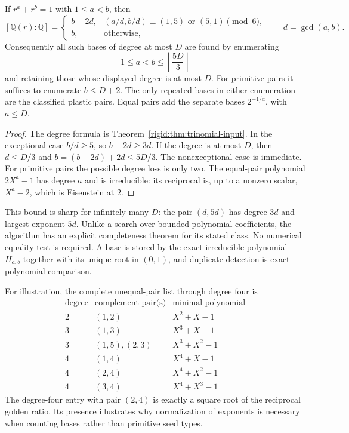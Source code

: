 \begin{corollary}
\label{rigid:cor:degree-search}
If $r^a+r^b=1$ with $1\le a<b$, then
\[
[\mathbb Q(r):\mathbb Q]=
\begin{cases}
b-2d,&(a/d,b/d)\equiv(1,5)\text{ or }(5,1)\pmod6,\\
b,&\text{otherwise},
\end{cases}
\qquad d=\gcd(a,b).
\]
Consequently all such bases of degree at most $D$ are found by
enumerating
\[
1\le a<b\le\left\lfloor\frac{5D}{3}\right\rfloor
\]
and retaining those whose displayed degree is at most $D$.
For primitive pairs it suffices to enumerate $b\le D+2$.
The only repeated bases in either enumeration are the classified
plastic pairs.  Equal pairs add the separate bases $2^{-1/a}$,
with $a\le D$.
\end{corollary}

\begin{proof}
The degree formula is Theorem~\ref{rigid:thm:trinomial-input}.  In the
exceptional case $b/d\ge5$, so $b-2d\ge3d$.  If the degree is
at most $D$, then $d\le D/3$ and
$b=(b-2d)+2d\le5D/3$.  The nonexceptional case is immediate.
For primitive pairs the possible degree loss is only two.
The equal-pair polynomial $2X^a-1$ has degree $a$ and is
irreducible: its reciprocal is, up to a nonzero scalar,
$X^a-2$, which is Eisenstein at $2$.
\end{proof}

This bound is sharp for infinitely many $D$: the pair $(d,5d)$
has degree $3d$ and largest exponent $5d$.
Unlike a search over bounded polynomial coefficients, the algorithm
has an explicit completeness theorem for its stated class.  No
numerical equality test is required.  A base is stored by the exact
irreducible polynomial $H_{a,b}$ together with its unique root in
$(0,1)$, and duplicate detection is exact polynomial comparison.

For illustration, the complete unequal-pair list through degree four is
\[
\begin{array}{ccl}
\text{degree}&\text{complement pair(s)}&\text{minimal polynomial}\\\hline
2&(1,2)&X^2+X-1\\
3&(1,3)&X^3+X-1\\
3&(1,5),(2,3)&X^3+X^2-1\\
4&(1,4)&X^4+X-1\\
4&(2,4)&X^4+X^2-1\\
4&(3,4)&X^4+X^3-1
\end{array}
\]
The degree-four entry with pair $(2,4)$ is exactly a square root of
the reciprocal golden ratio.  Its presence illustrates why normalization
of exponents is necessary when counting bases rather than primitive
seed types.

